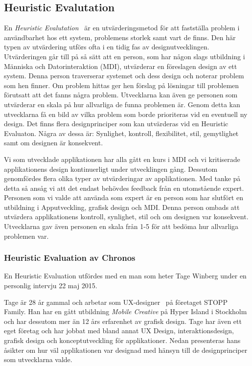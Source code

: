 \documentclass[a4paper, 11pt]{article}
\begin{document}
\subsection{Heuristic Evalutation}
En \textit{Heuristic Evalutation}~\cite[sid 228--229]{benyon2010designing} är en utvärderingsmetod för att fastställa problem i användbarhet hos ett system, problemens storlek samt vart de finns. Den här typen av utvärdering utförs ofta i en tidig fas av designutvecklingen. 
Utvärderingen går till på så sätt att en person, som har någon slags utbildning i Människa och Datorinteraktion (MDI), utvärderar en föreslagen design av ett system. Denna person traverserar systemet och dess design och noterar problem som hen finner. Om problem hittas ger hen förslag på lösningar till problemen förutsatt att det fanns några problem. Utvecklarna kan även ge personen som utvärderar en skala på hur allvarliga de funna problemen är. Genom detta kan utvecklarna få en bild av vilka problem som borde prioriteras vid en eventuell ny design. Det finns flera designprinciper som kan utvärderas vid en Heuristic Evaluaton. Några av dessa är: Synlighet, kontroll, flexibilitet, stil, gemytlighet samt om designen är konsekvent.

Vi som utvecklade applikationen har alla gått en kurs i MDI och vi kritiserade applikationens design kontinuerligt under utvecklingen gång. Dessutom genomfördes flera olika typer av utvärderingar av applikationen. Med tanke på detta så ansåg vi att det endast behövdes feedback från en utomstående expert. Personen som vi valde att använda som expert är en person som har slutfört en utbildning i Apputveckling, grafisk design och MDI. 
Denna person ombads att utvärdera applikationens kontroll, synlighet, stil och om designen var konsekvent. Utvecklarna gav även personen en skala från 1-5 för att bedöma hur allvarliga problemen var.  

\subsubsection{Heuristic Evaluation av Chronos}
En Heuristic Evaluation utfördes med en man som heter Tage Winberg under en personlig intervju 22 maj 2015. 

Tage är 28 år gammal och arbetar som UX-designer~\cite{uxdesign} på företaget STOPP Family. Han har en gått utbildning \textit{Mobile Creative} på Hyper Island i Stockholm och har dessutom mer än 12 års erfarenhet av grafisk design. Tage har även ett eget företag och har jobbat med bland annat UX Design, interaktionsdesign, grafisk design och konceptutveckling för applikationer.
Nedan presenteras hans åsikter om hur väl applikationen var designad med hänsyn till de designprinciper som utvecklarna valde.
\end{document}
